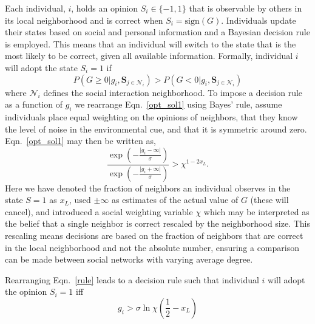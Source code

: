 \documentclass[aps,prl,twocolumn,showpacs,superscriptaddress,groupedaddress]{revtex4}
\begin{document}
Each individual, $i$, holds an opinion $S_i \in \{ -1,1\}$ that is observable by others in its local neighborhood and is correct when $S_i = \mbox{sign}(G)$. Individuals update their states based on social and personal information and a Bayesian decision rule \cite{nitzan1982optimal,perez2011collective, Perreault, torney2015} is employed. This means that an individual will switch to the state that is the most likely to be correct, given all available information. Formally, individual $i$ will adopt the state $S_i=1$ if
\begin{equation}
 P\left(G \ge 0\big| g_i, \mathbf{S}_{j\in \mathcal{N}_i}\right)  > P\left(G < 0\big| g_i, \mathbf{S}_{j\in \mathcal{N}_i}\right)
\label{opt_sol1}
\end{equation}
where $\mathcal{N}_i$ defines the social interaction neighborhood. To impose a decision rule as a function of $g_i$ we rearrange Eqn.~\ref{opt_sol1} using Bayes' rule, assume individuals place equal weighting on the opinions of neighbors, that they know the level of noise in the environmental cue, and that it is symmetric around zero. Eqn.~\ref{opt_sol1} may then be written as,
\begin{equation}
\frac{\exp{ \left( - \frac{\vert g_i -  \infty \vert}{\sigma} \right)}}{\exp{ \left( - \frac{\vert g_i + \infty \vert}{\sigma} \right)}} > \chi^{1-2x_L}.
\label{rule}
\end{equation}
Here we have denoted the fraction of neighbors an individual observes in the state $S=1$ as $x_L$, used $\pm \infty$ as estimates of the actual value of $G$ (these will cancel), and introduced a social weighting variable $\chi$ which may be interpreted as the belief that a single neighbor is correct rescaled by the neighborhood size. This rescaling means decisions are based on the fraction of neighbors that are correct in the local neighborhood and not the absolute number, ensuring a comparison can be made between social networks with varying average degree.

Rearranging Eqn.~\ref{rule} leads to a decision rule such that individual $i$ will adopt the opinion $S_i = 1$ iff
\begin{equation}
g_i >  \sigma\ln\chi  \left(\frac{1}{2}-x_L\right) 
\label{opt_rule}
\end{equation}


\end{document}
